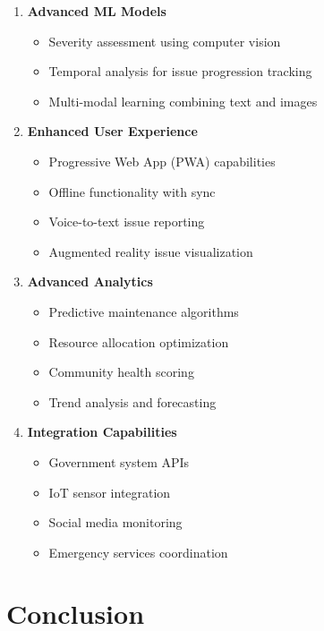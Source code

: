 \documentclass[12pt,a4paper]{article}
\begin{document}
\begin{enumerate}
    \item \textbf{Advanced ML Models}
    \begin{itemize}
        \item Severity assessment using computer vision
        \item Temporal analysis for issue progression tracking
        \item Multi-modal learning combining text and images
    \end{itemize}
    
    \item \textbf{Enhanced User Experience}
    \begin{itemize}
        \item Progressive Web App (PWA) capabilities
        \item Offline functionality with sync
        \item Voice-to-text issue reporting
        \item Augmented reality issue visualization
    \end{itemize}
    
    \item \textbf{Advanced Analytics}
    \begin{itemize}
        \item Predictive maintenance algorithms
        \item Resource allocation optimization
        \item Community health scoring
        \item Trend analysis and forecasting
    \end{itemize}
    
    \item \textbf{Integration Capabilities}
    \begin{itemize}
        \item Government system APIs
        \item IoT sensor integration
        \item Social media monitoring
        \item Emergency services coordination
    \end{itemize}
\end{enumerate}

\section{Conclusion}
\end{document}
